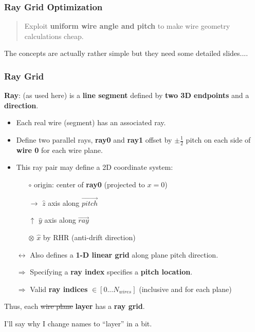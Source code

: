 \documentclass[xcolor=dvipsnames]{beamer}
\begin{document}
\begin{frame}
  \frametitle{Ray Grid Optimization}

  \begin{quote}
    Exploit \textbf{uniform wire angle and pitch} to make wire geometry calculations cheap.
  \end{quote}
  

  The concepts are actually rather simple but they need some detailed slides....


\end{frame}

\begin{frame}
  \frametitle{Ray Grid}

  \textbf{Ray}: (as used here) is a \textbf{line segment} defined by \textbf{two 3D endpoints} and a \textbf{direction}.    

  \begin{itemize}
  \item Each real wire (segment) has an associated ray.
  \item Define two parallel rays, \textbf{ray0} and \textbf{ray1} offset by $\pm\frac{1}{2}$ pitch on each side of \textbf{wire 0} for each wire plane.

  \item This ray pair may define a 2D coordinate system:
    \begin{itemize}\footnotesize
    \item[$\circ$] origin: center of \textbf{ray0} (projected to $x=0$)
    \item[$\to$] $\hat{z}$ axis along $\overrightarrow{pitch}$
    \item[$\uparrow$] $\hat{y}$ axis along $\overrightarrow{ray}$
    \item[$\otimes$] $\hat{x}$ by RHR (anti-drift direction)
    \end{itemize}
  \item[$\leftrightarrow$] Also defines a \textbf{1-D linear grid} along plane pitch direction.    
  \item[$\Rightarrow$] Specifying a \textbf{ray index} specifies a \textbf{pitch location}.
  \item[$\Rightarrow$] Valid \textbf{ray indices} $\in[0...N_{wires}]$ (inclusive and for each plane)
  \end{itemize}
  Thus, each \sout{wire plane} \textbf{layer} has a \textbf{ray grid}.

  \tiny I'll say why I change names to ``layer'' in a bit.

\end{frame}
\end{document}
